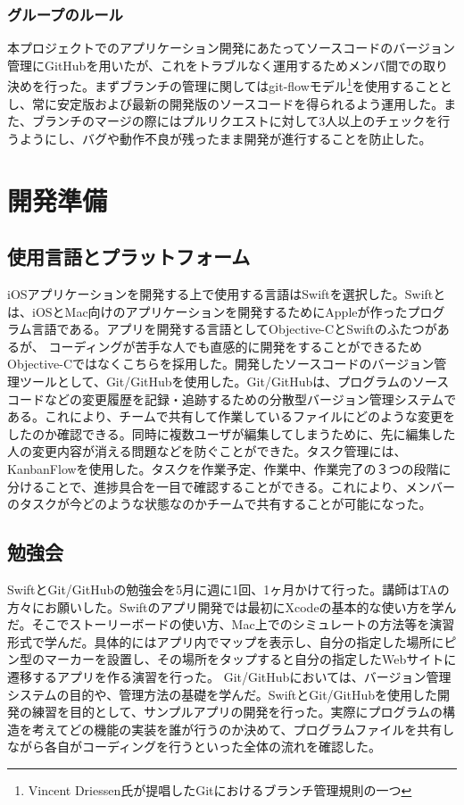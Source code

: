 \documentclass[openany,11pt,papersize]{jsbook}
\begin{document}
\subsection{グループのルール}
本プロジェクトでのアプリケーション開発にあたってソースコードのバージョン管理にGitHubを用いたが、これをトラブルなく運用するためメンバ間での取り決めを行った。まずブランチの管理に関してはgit-flowモデル\footnote{Vincent Driessen氏が提唱したGitにおけるブランチ管理規則の一つ}を使用することとし、常に安定版および最新の開発版のソースコードを得られるよう運用した。また、ブランチのマージの際にはプルリクエストに対して3人以上のチェックを行うようにし、バグや動作不良が残ったまま開発が進行することを防止した。
\chapter{開発準備}

\section{使用言語とプラットフォーム}

iOSアプリケーションを開発する上で使用する言語はSwiftを選択した。Swiftとは、iOSとMac向けのアプリケーションを開発するためにAppleが作ったプログラム言語である。アプリを開発する言語としてObjective-CとSwiftのふたつがあるが、
コーディングが苦手な人でも直感的に開発をすることができるためObjective-Cではなくこちらを採用した。開発したソースコードのバージョン管理ツールとして、Git/GitHubを使用した。Git/GitHubは、プログラムのソースコードなどの変更履歴を記録・追跡するための分散型バージョン管理システムである。これにより、チームで共有して作業しているファイルにどのような変更をしたのか確認できる。同時に複数ユーザが編集してしまうために、先に編集した人の変更内容が消える問題などを防ぐことができた。タスク管理には、KanbanFlowを使用した。タスクを作業予定、作業中、作業完了の３つの段階に分けることで、進捗具合を一目で確認することができる。これにより、メンバーのタスクが今どのような状態なのかチームで共有することが可能になった。

\section{勉強会}
SwiftとGit/GitHubの勉強会を5月に週に1回、1ヶ月かけて行った。講師はTAの方々にお願いした。Swiftのアプリ開発では最初にXcodeの基本的な使い方を学んだ。そこでストーリーボードの使い方、Mac上でのシミュレートの方法等を演習形式で学んだ。具体的にはアプリ内でマップを表示し、自分の指定した場所にピン型のマーカーを設置し、その場所をタップすると自分の指定したWebサイトに遷移するアプリを作る演習を行った。
Git/GitHubにおいては、バージョン管理システムの目的や、管理方法の基礎を学んだ。SwiftとGit/GitHubを使用した開発の練習を目的として、サンプルアプリの開発を行った。実際にプログラムの構造を考えてどの機能の実装を誰が行うのか決めて、プログラムファイルを共有しながら各自がコーディングを行うといった全体の流れを確認した。
\end{document}
